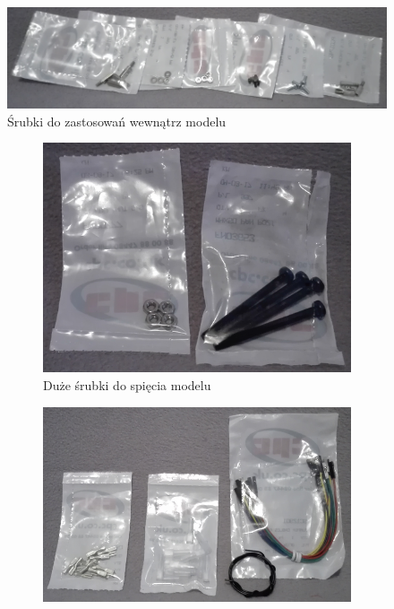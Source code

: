 \begin{figure}[H]
    \centering
    \includegraphics[width=0.9\linewidth]{photos/screws1.png}
    \caption*{Śrubki do zastosowań wewnątrz modelu}
\end{figure}
\begin{figure}[H]
    \centering
    \begin{subfigure}{0.32\textwidth}
        \centering
        \includegraphics[width=0.9\linewidth]{photos/screws2.png}
        \caption*{Duże śrubki do spięcia modelu}
    \end{subfigure}
    \begin{subfigure}{0.32\textwidth}
        \centering
        \includegraphics[width=0.9\linewidth]{photos/cables.png}

\end{subfigure}
\end{figure}
